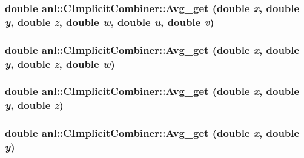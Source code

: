 \label{classanl_1_1CImplicitCombiner_a226d15de3528d906080a7ab7baeaf32c}
\hypertarget{classanl_1_1CImplicitCombiner_abb7287cce930c621637e2b2302b391d8}{
\subsubsection[{Avg\_\-get}]{\setlength{\rightskip}{0pt plus 5cm}double anl::CImplicitCombiner::Avg\_\-get (double {\em x}, \/  double {\em y}, \/  double {\em z}, \/  double {\em w}, \/  double {\em u}, \/  double {\em v})}}
\label{classanl_1_1CImplicitCombiner_abb7287cce930c621637e2b2302b391d8}
\hypertarget{classanl_1_1CImplicitCombiner_a88bc1433df280b7a098ee704ce71a60d}{
\subsubsection[{Avg\_\-get}]{\setlength{\rightskip}{0pt plus 5cm}double anl::CImplicitCombiner::Avg\_\-get (double {\em x}, \/  double {\em y}, \/  double {\em z}, \/  double {\em w})}}
\label{classanl_1_1CImplicitCombiner_a88bc1433df280b7a098ee704ce71a60d}
\hypertarget{classanl_1_1CImplicitCombiner_ab9d81b3b9aac42b11bbb9cef2f261fbe}{
\subsubsection[{Avg\_\-get}]{\setlength{\rightskip}{0pt plus 5cm}double anl::CImplicitCombiner::Avg\_\-get (double {\em x}, \/  double {\em y}, \/  double {\em z})}}
\label{classanl_1_1CImplicitCombiner_ab9d81b3b9aac42b11bbb9cef2f261fbe}
\hypertarget{classanl_1_1CImplicitCombiner_aba0c7d2cc2df41bbf7a9b173309380f6}{
\subsubsection[{Avg\_\-get}]{\setlength{\rightskip}{0pt plus 5cm}double anl::CImplicitCombiner::Avg\_\-get (double {\em x}, \/  double {\em y})}}
